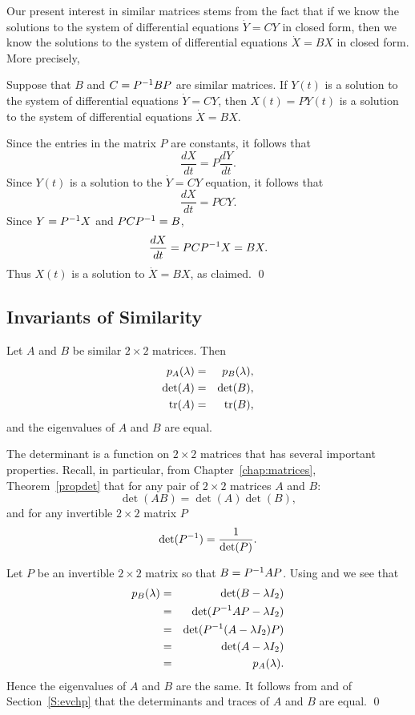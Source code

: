 Our present interest in similar matrices stems from the fact that if we
know the solutions to the system of differential equations $\dot{Y}=CY$ in
closed form, then we know the solutions to the system of differential
equations $\dot{X}=BX$ in closed form.  More precisely,
\begin{lemma}  \label{L:simsoln}
Suppose that $B$ and $C=P^{-1} BP$ are similar matrices.  If
$Y(t)$ is a solution to the system of differential equations
$\dot{Y}=CY$, then $X(t)=PY(t)$ is a solution to the system of 
differential equations $\dot{X}=BX$.
\end{lemma}

\proof   Since the entries in the matrix $P$ are constants, it follows that
\[
\frac{dX}{dt} = P\frac{dY}{dt}.
\]
Since $Y(t)$ is a solution to the $\dot{Y}=CY$ equation, it follows that
\[
\frac{dX}{dt} = PCY.
\]
Since $Y=P^{-1} X$ and $PCP^{-1} = B$,
\[
\frac{dX}{dt} = PCP^{-1} X = BX.
\]
Thus $X(t)$ is a solution to $\dot{X}=BX$, as claimed.  \qed


\subsection*{Invariants of Similarity}

\begin{lemma}  \label{L:simdettr}
Let $A$ and $B$ be similar $2\times 2$ matrices.  Then
\begin{eqnarray*}
p_A(\lambda) & = & p_B(\lambda),\\
\det(A) & = & \det(B),\\
{\rm tr}(A) & = & {\rm tr}(B),
\end{eqnarray*} 
and the eigenvalues of $A$ and $B$ are equal.
\end{lemma}

\proof
The determinant is a function on $2\times 2$ matrices
that has several important properties.  Recall, in particular, from
Chapter~\ref{chap:matrices}, Theorem~\ref{propdet} that for any pair of
$2\times 2$ matrices $A$ and $B$:
\begin{equation} \label{e:detprod}
\det(AB) =  \det(A)\det(B),
\end{equation}
and for any invertible $2\times 2$ matrix $P$
\begin{equation}  \label{e:detinv}
\det(P^{-1})  =  \frac{1}{\det(P)}.
\end{equation}

Let $P$ be an invertible $2\times 2$ matrix so that $B=P^{-1} AP$.
Using  and  we see that
\begin{eqnarray*}
p_B(\lambda) & = & \det(B-\lambda I_2) \\
 & = & \det(P^{-1} AP-\lambda I_2) \\
& = & \det(P^{-1}(A-\lambda I_2)P) \\
& = & \det(A-\lambda I_2) \\
& = & p_A(\lambda).
\end{eqnarray*}
Hence the eigenvalues of $A$ and $B$ are the same.  It follows
from  and  of Section~\ref{S:evchp}
that the determinants and traces of $A$ and $B$ are equal.   \qed

